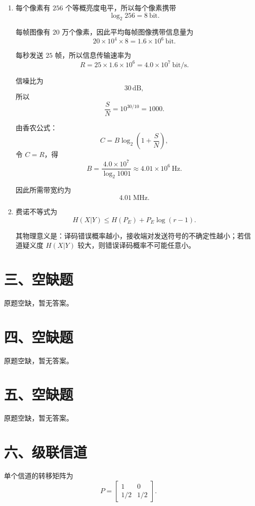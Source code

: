 \documentclass[UTF8,a4paper,12pt]{ctexart}
\begin{document}
\begin{enumerate}[label=\arabic*., leftmargin=2em]
\item 每个像素有 $256$ 个等概亮度电平，所以每个像素携带
\[
\log_2 256=8\ \text{bit}.
\]

每帧图像有 $20$ 万个像素，因此平均每帧图像携带信息量为
\[
20\times 10^4\times 8=1.6\times 10^6\ \text{bit}.
\]

每秒发送 $25$ 帧，所以信息传输速率为
\[
R=25\times 1.6\times 10^6
=4.0\times 10^7\ \text{bit/s}.
\]

信噪比为
\[
30\,\mathrm{dB},
\]
所以
\[
\frac SN=10^{30/10}=1000.
\]

由香农公式：
\[
C=B\log_2\left(1+\frac SN\right),
\]
令 $C=R$，得
\[
B=\frac{4.0\times 10^7}{\log_2 1001}
\approx 4.01\times 10^6\ \mathrm{Hz}.
\]

因此所需带宽约为
\[
4.01\ \mathrm{MHz}.
\]

\item 费诺不等式为
\[
H(X|Y)\leq H(P_E)+P_E\log(r-1).
\]

其物理意义是：译码错误概率越小，接收端对发送符号的不确定性越小；若信道疑义度 $H(X|Y)$ 较大，则错误译码概率不可能任意小。
\end{enumerate}

\section*{三、空缺题}

原题空缺，暂无答案。

\section*{四、空缺题}

原题空缺，暂无答案。

\section*{五、空缺题}

原题空缺，暂无答案。

\section*{六、级联信道}

单个信道的转移矩阵为
\[
P=
\begin{bmatrix}
1&0\\
1/2&1/2
\end{bmatrix}.
\]
\end{document}
